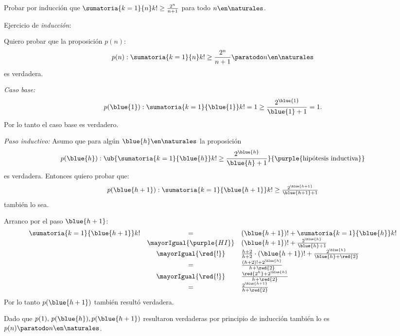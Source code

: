 \begin{enunciado}{\ejExtra}

  Probar por inducción que $\sumatoria{k=1}{n} k! \geq \frac{2^n}{n+1}$ para todo $n \en \naturales$.
\end{enunciado}

Ejercicio de \textit{inducción}:

Quiero probar que la proposición $p(n)$:
$$
  p(n) : \sumatoria{k=1}{n} k! \geq \frac{2^n}{n+1} \paratodo n \en \naturales
$$
es verdadera.

\textit{Caso base:}
$$
  p(\blue{1}) : \sumatoria{k=1}{\blue{1}} k!  = 1 \geq \frac{2^{\blue{1}}}{\blue{1} + 1} = 1.
$$
Por lo tanto el caso base es verdadero.

\bigskip

\textit{Paso inductivo:}
Asumo que para algún $\blue{h} \en \naturales$ la proposición
$$
  p(\blue{h}) :
  \ub{
    \sumatoria{k = 1}{\blue{h}} k!  \geq \frac{2^{\blue{h}}}{\blue{h} + 1}
  }{
    \text{\purple{hipótesis inductiva}}
  }
$$
es verdadera. Entonces quiero probar que:
$$
  \textstyle
  p(\blue{h + 1}) : \sumatoria{k=1}{\blue{h + 1}} k!  \geq \frac{2^{\blue{h + 1}}}{\blue{ h + 1 } + 1}
$$
también lo sea.

Arranco por el paso $\blue{h + 1}$:
$$
  \begin{array}{rcl}
    \sumatoria{k = 1}{\blue{h + 1}} k!
     & =                        &
    (\blue{h + 1})! + \sumatoria{k = 1}{\blue{h}} k!                                  \\
     & \mayorIgual{\purple{HI}} &
    (\blue{h + 1})! +  \frac{2^{\blue{h}}}{\blue{h} + 1}                              \\
     & \mayorIgual{\red{!}}     &
    \frac{h+2}{h+2} \cdot  (\blue{h + 1})! +  \frac{2^{\blue{h}}}{\blue{h} + \red{2}} \\
     & =                        &
    \frac{(h+2)! +  2^{\blue{h}}}{h + \red{2}}                                        \\
     & \mayorIgual{\red{!}}     &
    \frac{\red{2^h} +  2^{\blue{h}}}{h + \red{2}}                                     \\
     & =                        &
    \frac{2^{\blue{h + 1}}}{h + \red{2}}                                              \\
  \end{array}
$$
Por lo tanto $p(\blue{h+1})$ también resultó verdadera.

\bigskip

Dado que $p(1),\, p(\blue{h}), p(\blue{h + 1})$ resultaron verdaderas por principio de inducción
también lo es $p(n) \paratodo n \en \naturales$.
